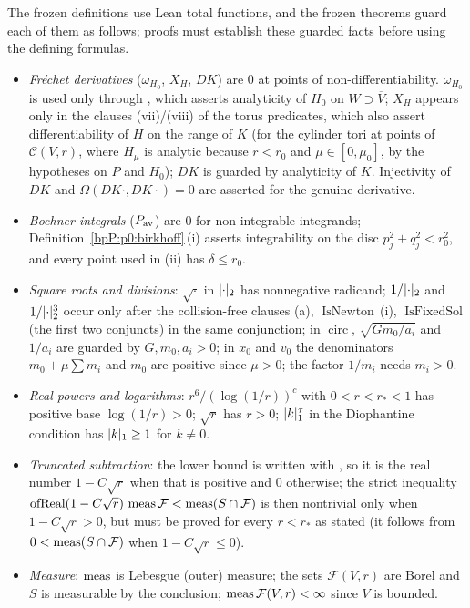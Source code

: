 \begin{remark}\label{bpP:p0:totality}
The frozen definitions use Lean total functions, and the frozen theorems guard each of them as follows; proofs must
establish these guarded facts before using the defining formulas.
\begin{itemize}
\item \emph{Fr\'echet derivatives} ($\omega_{H_0}$, $X_H$, $DK$) are $0$ at points of non-differentiability. $\omega_{H_0}$ is used only through
  , which asserts analyticity of $H_0$ on $W\supset\overline V$; $X_H$ appears only in the clauses (vii)/(viii)
  of the torus predicates, which also assert differentiability of $H$ on the range of $K$ (for the cylinder tori at points of
  $\mathcal C(V,r)$, where $H_\mu$ is analytic because $r<r_0$ and $\mu\in[0,\mu_0]$, by the hypotheses on $P$ and $H_0$); $DK$ is guarded by analyticity of $K$.
  Injectivity of $DK$ and $\Omega(DK\cdot,DK\cdot)=0$ are asserted for the genuine derivative.
\item \emph{Bochner integrals} ($P_{\rm av}$) are $0$ for non-integrable integrands; Definition~\ref{bpP:p0:birkhoff}\,(i) asserts integrability
  on the disc $p_j^2+q_j^2<r_0^2$, and every point used in (ii) has $\delta\le r_0$.
\item \emph{Square roots and divisions}: $\sqrt{\cdot}$ in $\lvert \cdot\rvert_2$ has nonnegative radicand; $1/\lvert \cdot\rvert_2$ and $1/\lvert \cdot\rvert_2^3$ occur only after
  the collision-free clauses (a), $\operatorname{IsNewton}$\,(i), $\operatorname{IsFixedSol}$ (the first two conjuncts) in the same conjunction; in
  $\operatorname{circ}$, $\sqrt{Gm_0/a_i}$ and $1/a_i$ are guarded by $G,m_0,a_i>0$; in $x_0$ and $v_0$ the denominators $m_0+\mu\sum m_i$ and $m_0$
  are positive since $\mu>0$; the factor $1/m_i$ needs $m_i>0$.
\item \emph{Real powers and logarithms}: $r^6/(\log(1/r))^c$ with $0<r<r_*<1$ has positive base $\log(1/r)>0$; $\sqrt r$ has $r>0$;
  $\lvert k\rvert_1^{\tau}$ in the Diophantine condition has $\lvert k\rvert_1\ge1$ for $k\ne0$.
\item \emph{Truncated subtraction}: the lower bound is written with , so it is the real number $1-C\sqrt r$ when
  that is positive and $0$ otherwise; the strict inequality $\operatorname{ofReal}(1-C\sqrt r)\,\operatorname{meas}\mathcal F<\operatorname{meas}(S\cap\mathcal F)$ is then nontrivial only when $1-C\sqrt r>0$, but must be proved for every $r<r_*$ as stated (it
  follows from $0<\operatorname{meas}(S\cap\mathcal F)$ when $1-C\sqrt r\le0$).
\item \emph{Measure}: $\operatorname{meas}$ is Lebesgue (outer) measure; the sets $\mathcal F(V,r)$ are Borel and $S$ is measurable by the conclusion;
  $\operatorname{meas}\mathcal F(V,r)<\infty$ since $V$ is bounded.
\end{itemize}
\end{remark}


